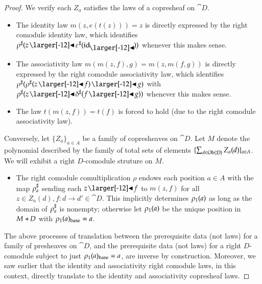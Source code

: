 \documentclass{amsart}
\begin{document}
\begin{proof}
  We verify each $Z_a$ satisfies the laws of a copresheaf on $\cat{D}$.
  \begin{itemize}
  \item The identity law $m(z, e(t(z))) = z$ is directly expressed by
    the right comodule identity law, which identifies
    ${\anydirmapof{\rho}{z \subd \anydirmapof{\varepsilon}{\idsubd}}}$
    whenever this makes sense.
  \item The associativity law $m(m(z, f), g) = m(z, m(f, g))$ is
    directly expressed by the right comodule associativity law, which
    identifies
    ${\anydirmapof{\rho}{\anydirmapof{\rho}{z \subd f} \subd g}}$ with
    ${\anydirmapof{\rho}{z \subd \anydirmapof{\delta}{f \subd g}}}$ whenever this makes sense.
  \item The law $t(m(z, f)) = t(f)$ is forced to hold (due to the
    right comodule associativity law).
  \end{itemize}

  Conversely, let $\{Z_a\}_{a \in A}$ be a family of copresheaves on
  $\cat{D}$. Let $M$ denote the polynomial described by the family of
  total sets of elements
  $\{\sum_{d \in \operatorname{Ob}(\mathcal{D})}Z_a(d)\}_{a \in A}$. We will exhibit a right
  $D$-comodule struture on $M$.
  \begin{itemize}
  \item The right comodule comultiplication $\rho$ endows each position $a \in A$ with
    the map ${\rho}^\sharp_{a}$ sending each $z \subd f$ to $m(z, f)$ for
    all $z \in Z_a(d), f: d \to d' \in \cat{D}$. This implicitly
    determines ${\rho}_1(a)$ as long as the domain of ${\rho}^\sharp_{a}$ is
    nonempty; otherwise let ${\rho}_1(a)$ be the unique position in
    $M \mathrel{\triangleleft} D$ with ${\rho}_1(a)_{\mathrm{base}} = a$.
  \end{itemize}

  The above processes of translation between the prerequisite data
  (not laws) for a family of presheaves on $\cat{D}$, and the
  prerequisite data (not laws) for a right $D$-comodule subject to just
  ${\rho}_1(a)_{\mathrm{base}} = a$, are inverse by
  construction. Moreover, we saw earlier that the identity and
  associativity right comodule laws, in this context, directly translate
  to the identity and associativity copresheaf laws.
\end{proof}
\end{document}
